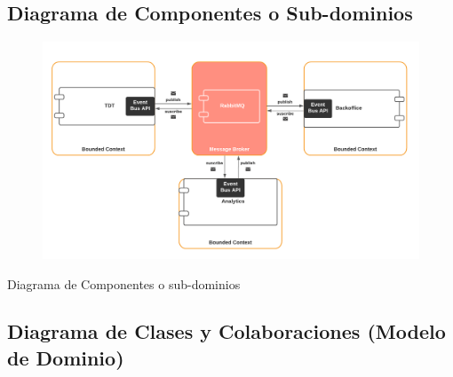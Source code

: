 \documentclass{article}
\begin{document}
\subsection{Diagrama de Componentes o Sub-dominios}

\begin{center}
\begin{figure}[h]
    \centering
    \includegraphics[scale=.3]{pics/dominios.png}%
    \label{fig:componente}\end{figure}
    \large{Diagrama de Componentes o sub-dominios}
\end{center}

\subsection{Diagrama de Clases y Colaboraciones (Modelo de Dominio)}
\end{document}
